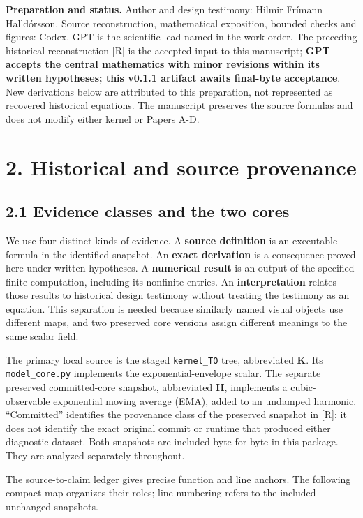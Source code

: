 \documentclass[
  11pt,
  a4paper,
]{article}
\begin{document}
\textbf{Preparation and status.} Author and design testimony: Hilmir Frímann Halldórsson. Source reconstruction, mathematical exposition, bounded checks and figures: Codex. GPT is the scientific lead named in the work order. The preceding historical reconstruction {[}R{]} is the accepted input to this manuscript; \textbf{GPT accepts the central mathematics with minor revisions within its written hypotheses; this v0.1.1 artifact awaits final-byte acceptance}. New derivations below are attributed to this preparation, not represented as recovered historical equations. The manuscript preserves the source formulas and does not modify either kernel or Papers A-D.

\section{2. Historical and source provenance}\label{historical-and-source-provenance}

\subsection{2.1 Evidence classes and the two cores}\label{evidence-classes-and-the-two-cores}

We use four distinct kinds of evidence. A \textbf{source definition} is an executable formula in the identified snapshot. An \textbf{exact derivation} is a consequence proved here under written hypotheses. A \textbf{numerical result} is an output of the specified finite computation, including its nonfinite entries. An \textbf{interpretation} relates those results to historical design testimony without treating the testimony as an equation. This separation is needed because similarly named visual objects use different maps, and two preserved core versions assign different meanings to the same scalar field.

The primary local source is the staged \texttt{kernel\_TO} tree, abbreviated \textbf{K}. Its \texttt{model\_core.py} implements the exponential-envelope scalar. The separate preserved committed-core snapshot, abbreviated \textbf{H}, implements a cubic-observable exponential moving average (EMA), added to an undamped harmonic. ``Committed'' identifies the provenance class of the preserved snapshot in {[}R{]}; it does not identify the exact original commit or runtime that produced either diagnostic dataset. Both snapshots are included byte-for-byte in this package. They are analyzed separately throughout.

The source-to-claim ledger gives precise function and line anchors. The following compact map organizes their roles; line numbering refers to the included unchanged snapshots.
\end{document}
